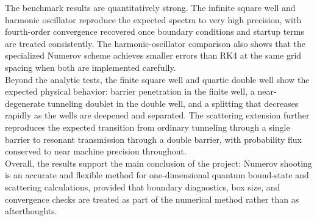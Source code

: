 \documentclass[11pt]{article}
\begin{document}
\begin{refsection}
        The benchmark results are quantitatively strong. The infinite square well and harmonic oscillator reproduce the expected spectra to very high precision, with fourth-order convergence recovered once boundary conditions and startup terms are treated consistently. The harmonic-oscillator comparison also shows that the specialized Numerov scheme achieves smaller errors than RK4 at the same grid spacing when both are implemented carefully. \\

        Beyond the analytic tests, the finite square well and quartic double well show the expected physical behavior: barrier penetration in the finite well, a near-degenerate tunneling doublet in the double well, and a splitting that decreases rapidly as the wells are deepened and separated. The scattering extension further reproduces the expected transition from ordinary tunneling through a single barrier to resonant transmission through a double barrier, with probability flux conserved to near machine precision throughout. \\

        Overall, the results support the main conclusion of the project: Numerov shooting is an accurate and flexible method for one-dimensional quantum bound-state and scattering calculations, provided that boundary diagnostics, box size, and convergence checks are treated as part of the numerical method rather than as afterthoughts.

    \printbibliography[heading=bibintoc,title={References}]
    \end{refsection}
\end{document}
